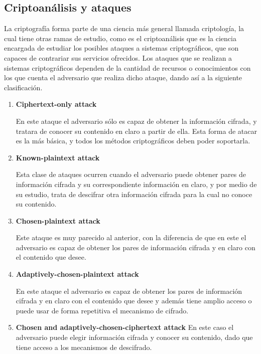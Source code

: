   \subsection{Criptoanálisis y ataques}

    La criptografía forma parte de una ciencia más general llamada
    criptología, la cual tiene otras ramas de estudio, como es el
    criptoanálisis que es la ciencia encargada de estudiar los posibles
    ataques a sistemas criptográficos, que son capaces de contrariar sus
    servicios ofrecidos.
    Los ataques que se realizan a sistemas criptográficos dependen de la 
    cantidad de recursos o conocimientos con los que cuenta el adversario 
    que realiza dicho ataque, dando así a la siguiente clasificación.

    \begin{enumerate}

      \item \textbf{Ciphertext-only attack}

        En este ataque el adversario sólo es capaz de obtener la información
        cifrada, y tratara de conocer su contenido en claro a partir de ella.
        Esta forma de atacar es la más básica, y todos los métodos
        criptográficos deben poder soportarla.

      \item \textbf{Known-plaintext attack}

        Esta clase de ataques ocurren cuando el adversario puede obtener pares
        de información cifrada y su correspondiente información en claro, y
        por medio de su estudio, trata de descifrar otra información cifrada
        para la cual no conoce su contenido.

      \item \textbf{Chosen-plaintext attack}

        Este ataque es muy parecido al anterior, con la diferencia de que en
        este el adversario es capaz de obtener los pares de información
        cifrada y en claro con el contenido que desee.

      \item \textbf{Adaptively-chosen-plaintext attack}

        En este ataque el adversario es capaz de obtener los pares de
        información cifrada y en claro con el contenido que desee y además 
        tiene amplio acceso o puede usar de forma repetitiva el mecanismo de
        cifrado.

      \item \textbf{Chosen and adaptively-chosen-ciphertext attack}
        En este caso el adversario puede elegir información cifrada y conocer
        su contenido, dado que tiene acceso a los mecanismos de descifrado.

    \end{enumerate}

